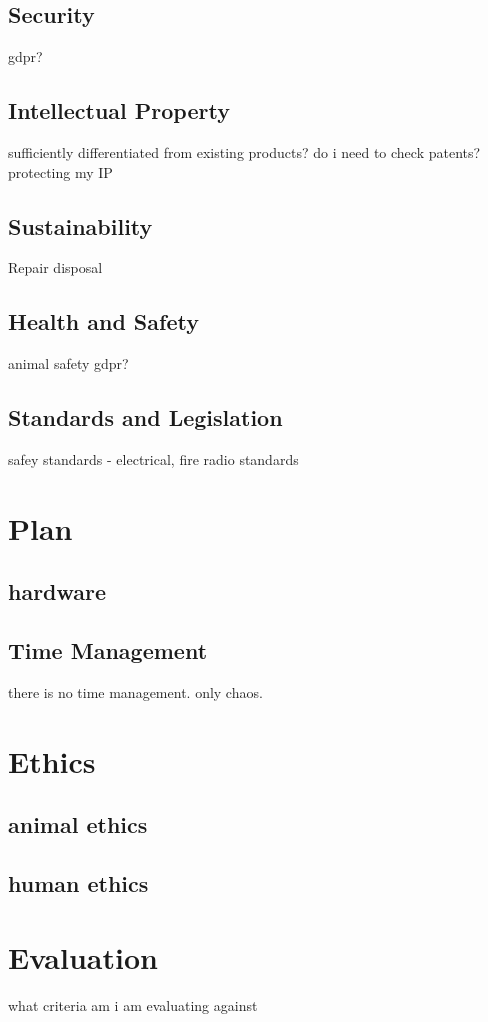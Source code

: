 \documentclass[11pt]{article}
\begin{document}
\subsection{Security}
gdpr?

\subsection{Intellectual Property}
sufficiently differentiated from existing products?
do i need to check patents?
protecting my IP
\subsection{Sustainability}
Repair
disposal

\subsection{Health and Safety}
animal safety
gdpr?

\subsection{Standards and Legislation}
safey standards - electrical, fire
radio standards

\section{Plan}
\subsection{hardware}

\subsection{Time Management}
there is no time management. only chaos.
\section{Ethics}
\subsection{animal ethics}
\subsection{human ethics}

\section{Evaluation}
what criteria am i am evaluating against 

\printbibliography
\end{document}

